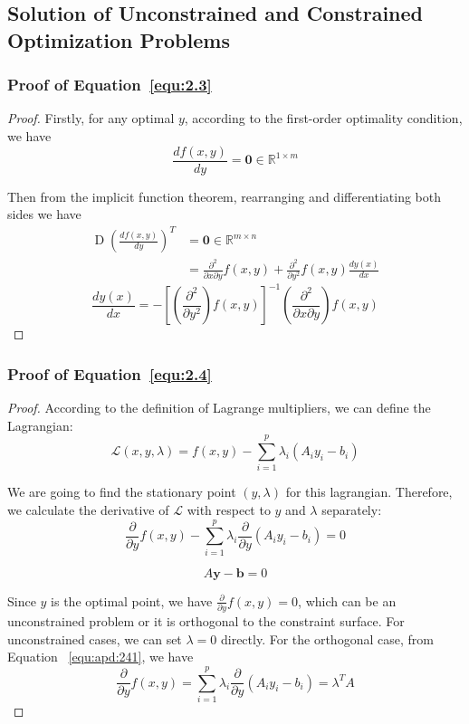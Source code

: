 \subsection{Solution of Unconstrained and Constrained Optimization Problems}
\subsubsection{Proof of Equation~\ref{equ:2.3}}
\label{appendix:equ2.3}
\begin{proof}
    Firstly, for any optimal $y$, according to the first-order optimality condition, we have
    $$
    \frac{df(x, y)}{dy} = \boldsymbol{0} \in \mathbb{R}^{1 \times m}
    $$
    \par Then from the implicit function theorem, rearranging and differentiating both sides we have
    $$
    \begin{aligned}
        \operatorname{D}(\frac{df(x, y)}{dy})^T &= \boldsymbol{0} \in \mathbb{R}^{m \times n} \\
        &= \frac{\partial^{2}}{\partial x \partial y}f(x,y) + \frac{\partial^2}{\partial y^2}f(x, y) \frac{dy(x)}{dx}
    \end{aligned}
    $$
    $$ \frac{dy(x)}{dx} = -[(\frac{\partial^2}{\partial y^2})f(x,y)]^{-1} (\frac{\partial^2}{\partial x \partial y})f(x, y)$$
\end{proof}

\subsubsection{Proof of Equation~\ref{equ:2.4}}
\label{appendix:equ2.4}
\begin{proof}
    According to the definition of Lagrange multipliers, we can define the Lagrangian:
    $$
    \mathcal{L}(x, y, \lambda)=f(x, y)-\sum_{i=1}^{p} \lambda_{i} (A_{i}y_i - b_i)
    $$
    \par We are going to find the stationary point $(y, \lambda)$ for this lagrangian. Therefore, we calculate the derivative of $\mathcal{L}$ with respect to $y$ and $\lambda$ separately: 
    \begin{equation}
        \label{equ:apd:241}
        \frac{\partial}{\partial y} f(x,y) - \sum_{i=1}^{p} \lambda_{i} \frac{\partial}{\partial y}(A_{i}y_i - b_i) = 0
    \end{equation}
    
    \begin{equation}
        A \boldsymbol{y} - \boldsymbol{b} = 0
    \end{equation}
    \par Since $y$ is the optimal point, we have $\frac{\partial}{\partial y} f(x,y) = 0$, which can be an unconstrained problem or it is orthogonal to the constraint surface. For unconstrained cases, we can set $\lambda = 0$ directly. For the orthogonal case, from Equation ~\ref{equ:apd:241}, we have
    $$
    \frac{\partial}{\partial y} f(x,y) = \sum_{i=1}^{p} \lambda_{i} \frac{\partial}{\partial y}(A_{i}y_i - b_i) = \lambda^T A
    $$
    
\end{proof}